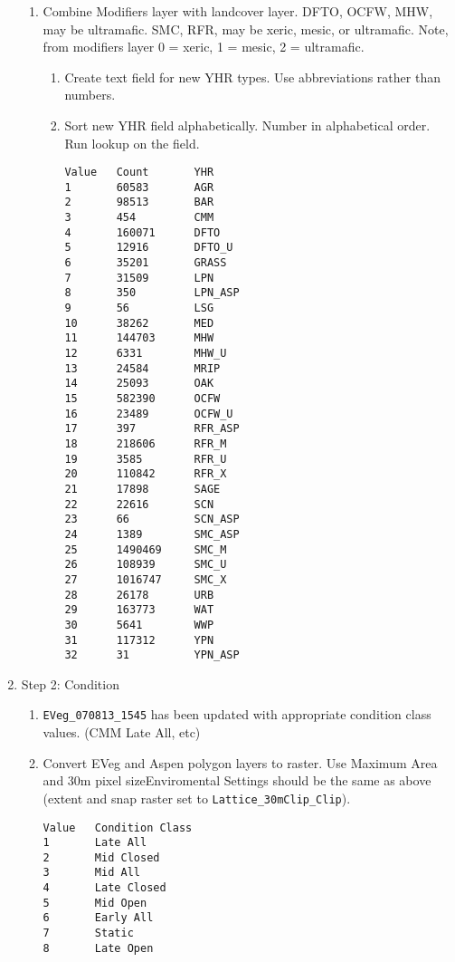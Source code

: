 \begin{enumerate}
\begin{enumerate}
    \item Combine Modifiers layer with landcover layer. DFTO, OCFW, MHW, may be ultramafic. SMC, RFR, may be xeric, mesic, or ultramafic. Note, from modifiers layer 0 = xeric, 1 = mesic, 2 = ultramafic.
    \begin{enumerate}
        \item Create text field for new YHR types. Use abbreviations rather than numbers.
        \item Sort new YHR field alphabetically. Number in alphabetical order. Run lookup on the field.
        \begin{verbatim}
Value   Count       YHR
1       60583       AGR
2       98513       BAR
3       454         CMM
4       160071      DFTO
5       12916       DFTO_U
6       35201       GRASS
7       31509       LPN
8       350         LPN_ASP
9       56          LSG
10      38262       MED
11      144703      MHW
12      6331        MHW_U
13      24584       MRIP
14      25093       OAK
15      582390      OCFW
16      23489       OCFW_U
17      397         RFR_ASP
18      218606      RFR_M
19      3585        RFR_U
20      110842      RFR_X
21      17898       SAGE
22      22616       SCN
23      66          SCN_ASP
24      1389        SMC_ASP
25      1490469     SMC_M
26      108939      SMC_U
27      1016747     SMC_X
28      26178       URB
29      163773      WAT
30      5641        WWP
31      117312      YPN
32      31          YPN_ASP
\end{verbatim}
        \end{enumerate}
    \end{enumerate}
    \item Step 2: Condition
    \begin{enumerate}
        \item \lstinline{EVeg_070813_1545} has been updated with appropriate condition class values. (CMM Late All, etc)
        \item Convert EVeg and Aspen polygon layers to raster. Use Maximum Area and 30m pixel sizeEnviromental Settings should be the same as above (extent and snap raster set to \lstinline{Lattice_30mClip_Clip}).
        \begin{verbatim}
Value   Condition Class
1       Late All
2       Mid Closed
3       Mid All
4       Late Closed
5       Mid Open
6       Early All
7       Static
8       Late Open


\end{verbatim}
\end{enumerate}
\end{enumerate}
